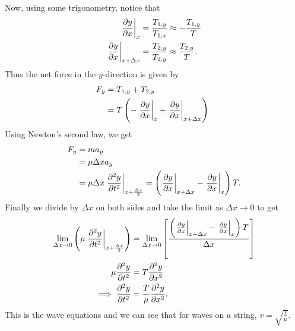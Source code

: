 \documentclass[../newtonian_mechanics.tex]{subfiles}
\begin{document}
        \paragraph{}
        Now, using some trigonometry, notice that
        \begin{align}
            \left.\pdv{y}{x}\right|_x&=\frac{T_{1,y}}{T_{1,x}}\approx -\frac{T_{1,y}}{T}\\
            \left.\pdv{y}{x}\right|_{x+\Delta x}&=\frac{T_{2,y}}{T_{2,y}}\approx\frac{T_{2,y}}{T}.
        \end{align}
        Thus the net force in the $y$-direction is given by
        \begin{align}
            F_y&=T_{1,y}+T_{2,y}\\
            &=T\left(-\left.\pdv{y}{x}\right|_x+\left.\pdv{y}{x}\right|_{x+\Delta x}\right).
        \end{align}
        Using Newton's second law, we get
        \begin{align}
            F_y&=ma_y\\
            &=\mu\Delta xa_y\\
            &=\mu\Delta x\left.\pdv[2]{y}{t}\right|_{x+\frac{\Delta x}{2}}=\left(\left.\pdv{y}{x}\right|_{x+\Delta x}-\left.\pdv{y}{x}\right|_x\right)T.
        \end{align}
        Finally we divide by $\Delta x$ on both sides and take the limit as $\Delta x\to0$ to get
        \begin{align}
            \lim_{\Delta x\to0}\left(\mu\left.\pdv[2]{y}{t}\right|_{x+\frac{\Delta x}{2}}\right)&=\lim_{\Delta x\to0}\left[\frac{\left(\left.\pdv{y}{x}\right|_{x+\Delta x}-\left.\pdv{y}{x}\right|_x\right)T}{\Delta x}\right]\\
            \mu\pdv[2]{y}{t}&=T\pdv[2]{y}{x}\\
            \implies\pdv[2]{y}{t}&=\frac{T}{\mu}\pdv[2]{y}{x}.
        \end{align}
        This is the wave equations and we can see that for waves on a string, $v=\sqrt{\frac{T}{\mu}}$.
\end{document}
